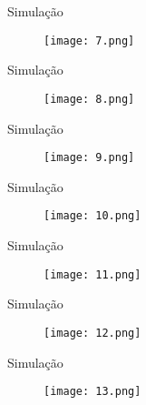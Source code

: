 \begin{frame}{Simulação}

  \begin{figure}[ht]
    \centering
    \texttt{[image: 7.png]}
  \end{figure}

\end{frame}

\begin{frame}{Simulação}

  \begin{figure}[ht]
    \centering
    \texttt{[image: 8.png]}
  \end{figure}

\end{frame}

\begin{frame}{Simulação}

  \begin{figure}[ht]
    \centering
    \texttt{[image: 9.png]}
  \end{figure}

\end{frame}

\begin{frame}{Simulação}

  \begin{figure}[ht]
    \centering
    \texttt{[image: 10.png]}
  \end{figure}

\end{frame}

\begin{frame}{Simulação}

  \begin{figure}[ht]
    \centering
    \texttt{[image: 11.png]}
  \end{figure}

\end{frame}

\begin{frame}{Simulação}

  \begin{figure}[ht]
    \centering
    \texttt{[image: 12.png]}
  \end{figure}

\end{frame}

\begin{frame}{Simulação}

  \begin{figure}[ht]
    \centering
    \texttt{[image: 13.png]}
  \end{figure}

\end{frame}